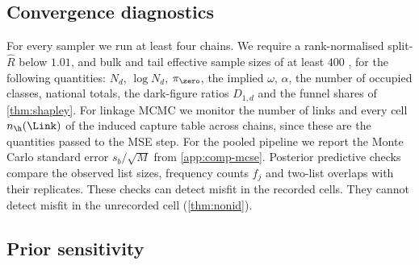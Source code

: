\subsection{Convergence diagnostics}\label{app:comp-diag}

For every sampler we run at least four chains. We require a rank-normalised split-$\widehat R$ below $1.01$, and bulk and tail effective sample sizes of at least $400$ \citep{vehtari2021}, for the following quantities: $N_d$, $\log N_d$, $\pi_{\zero}$, the implied $\omega$, $\alpha$, the number of occupied classes, national totals, the dark-figure ratios $D_{1,d}$ and the funnel shares of \cref{thm:shapley}. For linkage MCMC we monitor the number of links and every cell $n_{\h}(\Link)$ of the induced capture table across chains, since these are the quantities passed to the MSE step. For the pooled pipeline we report the Monte Carlo standard error $s_b/\sqrt M$ from \cref{app:comp-mcse}. Posterior predictive checks compare the observed list sizes, frequency counts $f_j$ and two-list overlaps with their replicates. These checks can detect misfit in the recorded cells. They cannot detect misfit in the unrecorded cell (\cref{thm:nonid}).

\subsection{Prior sensitivity}\label{app:comp-sens}

